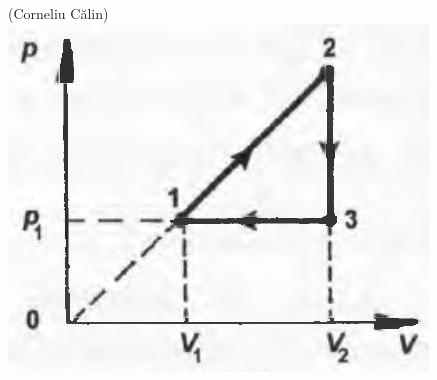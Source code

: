 \documentclass[10pt]{article}
\begin{document}
(Corneliu Călin)\\
\includegraphics[max width=\textwidth, center]{2025_07_01_5b3ff9fa0d508c8e9f17g-106}
\end{document}
